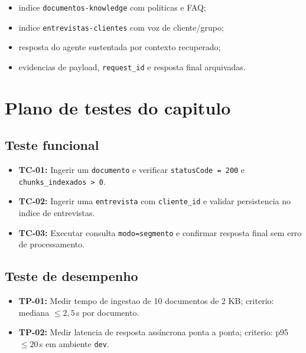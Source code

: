 \begin{itemize}[leftmargin=*]
  \item indice \texttt{documentos-knowledge} com politicas e FAQ;
  \item indice \texttt{entrevistas-clientes} com voz de cliente/grupo;
  \item resposta do agente sustentada por contexto recuperado;
  \item evidencias de payload, \texttt{request\_id} e resposta final arquivadas.
\end{itemize}

\section{Plano de testes do capitulo}

\subsection{Teste funcional}

\begin{itemize}[leftmargin=*]
  \item \textbf{TC-01:} Ingerir um \texttt{documento} e verificar
        \texttt{statusCode = 200} e \texttt{chunks\_indexados > 0}.
  \item \textbf{TC-02:} Ingerir uma \texttt{entrevista} com
        \texttt{cliente\_id} e validar persistencia no indice de entrevistas.
  \item \textbf{TC-03:} Executar consulta \texttt{modo=segmento} e confirmar
        resposta final sem erro de processamento.
\end{itemize}

\subsection{Teste de desempenho}

\begin{itemize}[leftmargin=*]
  \item \textbf{TP-01:} Medir tempo de ingestao de 10 documentos de 2 KB;
        criterio: mediana $\leq 2{,}5$\,s por documento.
  \item \textbf{TP-02:} Medir latencia de resposta ass\'incrona ponta a ponta;
        criterio: p95 $\leq 20$\,s em ambiente \texttt{dev}.
\end{itemize}

